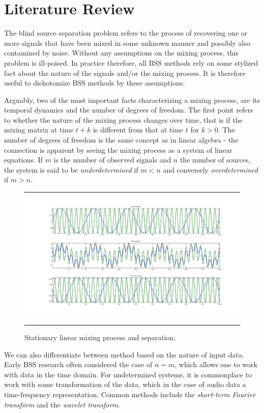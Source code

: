 \documentclass[11pt, oneside, a4paper]{report}
\begin{document}
\chapter{Literature Review}

The blind source separation problem refers to the process of
recovering one or more signals that have been mixed in some unknown
manner and possibly also contamined by noise. Without any assumptions
on the mixing process, this problem is ill-poised. In practice
therefore, all BSS methods rely on some stylized fact about the nature
of the signals and/or the mixing process. It is therefore useful to
dichotomize BSS methods by these assumptions.


Arguably, two of the most important facts characterizing a mixing
process, are its temporal dynamics and the number of degrees of
freedom. The first point refers to whether the nature of the mixing
process changes over time, that is if the mixing matrix at time $t+k$
is different from that at time $t$ for $k>0$. The number of degrees of
freedom is the same concept as in linear algebra - the connection is
apparent by seeing the mixing process as a system of linear
equations. If $m$ is the number of observed signals and $n$ the number
of sources, the system is said to be \emph{underdetermined} if $m<n$
and conversely \emph{overdetermined} if $m>n$. 

\begin{figure}
  \centering
  \hrule
  \includegraphics[width = .9\textwidth]{ica_simple}
  \hrule
  \caption{Stationary linear mixing process and separation.}
  \label{pca_time_series}
\end{figure}

We can also differentiate between method based on the nature of input
data. Early BSS research often considered the case of $n=m$, which
allows one to work with data in the time domain. For undetermined
systems, it is commonplace to work with some transformation of the
data, which in the case of audio data a time-frequency
representation. Common methods include the \emph{short-term Fourier
  transform} and the \emph{wavelet transform}.
\end{document}

